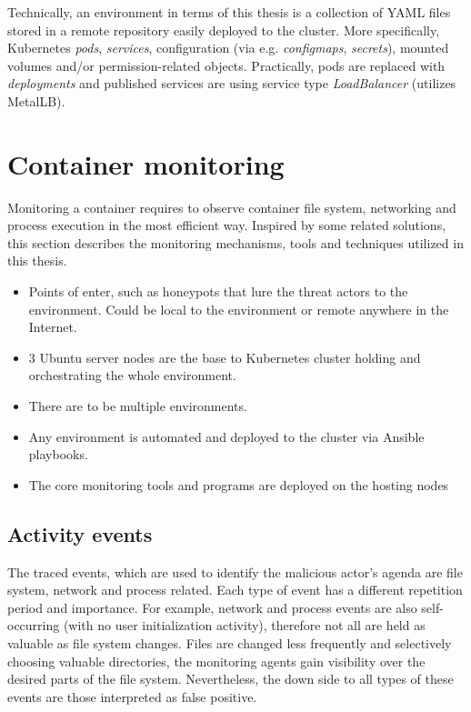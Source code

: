 Technically, an environment in terms of this thesis is a collection of YAML files stored in a remote repository easily deployed to the cluster. More specifically, Kubernetes \textit{pods}, \textit{services}, configuration (via e.g. \textit{configmaps}, \textit{secrets}), mounted volumes and/or permission-related objects. Practically, pods are replaced with \textit{deployments} and published services are using service type \textit{LoadBalancer} (utilizes MetalLB).


\section{Container monitoring \label{design:con-mon}}
Monitoring a container requires to observe container file system, networking and process execution in the most efficient way. Inspired by some related solutions, this section describes the monitoring mechanisms, tools and techniques utilized in this thesis.

\begin{itemize}
	\item 
	Points of enter, such as honeypots that lure the threat actors to the environment. Could be local to the environment or remote anywhere in the Internet.
	\item 
	3 Ubuntu server nodes are the base to Kubernetes cluster holding and orchestrating the whole environment.
	\item 
	There are to be multiple environments.
	\item
	Any environment is automated and deployed to the cluster via Ansible playbooks.
	\item 
	The core monitoring tools and programs are deployed on the hosting nodes
\end{itemize}

\subsection{Activity events \label{design:mon:events}}
The traced events, which are used to identify the malicious actor's agenda are file system, network and process related. Each type of event has a different repetition period and importance. For example, network and process events are also self-occurring (with no user initialization activity), therefore not all are held as valuable as file system changes. Files are changed less frequently and selectively choosing valuable directories, the monitoring agents gain visibility over the desired parts of the file system. Nevertheless, the down side to all types of these events are those interpreted as false positive.


